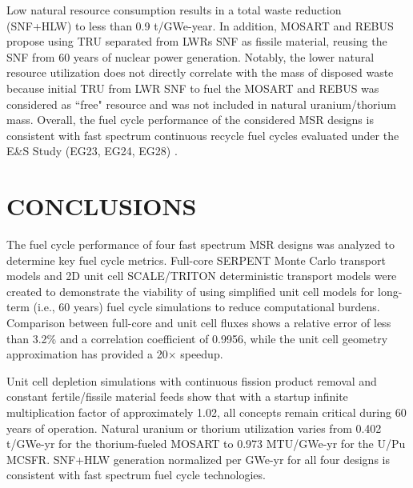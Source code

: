 \documentclass[letterpaper]{mandc2019}
\begin{document}
Low natural resource consumption results in a total waste reduction (\gls{SNF}+\gls{HLW}) to less than 0.9 t/GWe-year. %
In addition, \gls{MOSART} and REBUS propose using \gls{TRU} separated from \glspl{LWR} \gls{SNF} as fissile material, reusing the \gls{SNF} from 60 years of nuclear power generation. 
Notably, the lower natural resource utilization does not directly correlate with the mass of disposed waste because initial TRU from \gls{LWR} \gls{SNF} to fuel the \gls{MOSART} and REBUS was considered as ``free" resource and was not included in natural uranium/thorium mass. 
Overall, the fuel cycle performance of the considered \gls{MSR} designs is consistent with fast spectrum continuous recycle fuel cycles evaluated under the E\&S Study (EG23, EG24, EG28)  \cite{wigeland_nuclear_2014-4}. %
\section{CONCLUSIONS}
The fuel cycle performance of four fast spectrum \gls{MSR} designs was analyzed to determine key fuel cycle metrics. 
Full-core SERPENT Monte Carlo transport models and 2D unit cell SCALE/TRITON deterministic transport models were created to demonstrate the viability of using simplified unit cell models for long-term (i.e., 60 years) fuel cycle simulations to reduce computational burdens. 
Comparison between full-core and unit cell fluxes shows a relative error of less than 3.2\% and a correlation coefficient of 0.9956, while the unit cell geometry approximation has provided a 20$\times$ speedup.

Unit cell depletion simulations with continuous fission product removal and constant fertile/fissile material feeds show that with a startup infinite multiplication factor of approximately 1.02, all concepts remain critical during 60 years of operation. 
Natural uranium or thorium utilization varies from 0.402 t/GWe-yr for the thorium-fueled \gls{MOSART} to 0.973 MTU/GWe-yr for the U/Pu \gls{MCSFR}. 
\gls{SNF}+\gls{HLW} generation normalized per GWe-yr for all four designs is consistent with fast spectrum fuel cycle technologies. %
\end{document}
